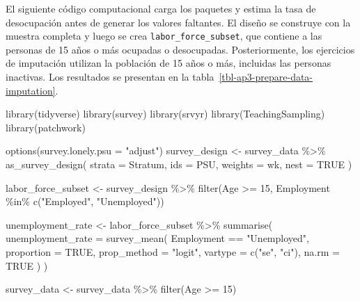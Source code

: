 \documentclass[
  spanish,
  11pt,
  letterpaper,
  oneside,
  open=any]{scrbook}
\newenvironment{Shaded}{\begin{snugshade}}{\end{snugshade}}
\newcommand{\AttributeTok}[1]{\textcolor[rgb]{0.40,0.45,0.13}{#1}}
\newcommand{\ConstantTok}[1]{\textcolor[rgb]{0.56,0.35,0.01}{#1}}
\newcommand{\DecValTok}[1]{\textcolor[rgb]{0.68,0.00,0.00}{#1}}
\newcommand{\FunctionTok}[1]{\textcolor[rgb]{0.28,0.35,0.67}{#1}}
\newcommand{\NormalTok}[1]{\textcolor[rgb]{0.00,0.23,0.31}{#1}}
\newcommand{\OtherTok}[1]{\textcolor[rgb]{0.00,0.23,0.31}{#1}}
\newcommand{\SpecialCharTok}[1]{\textcolor[rgb]{0.37,0.37,0.37}{#1}}
\newcommand{\StringTok}[1]{\textcolor[rgb]{0.13,0.47,0.30}{#1}}
\begin{document}
El siguiente código computacional carga los paquetes y estima la tasa de
desocupación antes de generar los valores faltantes. El diseño se
construye con la muestra completa y luego se crea
\texttt{labor\_force\_subset}, que contiene a las personas de 15 años o
más ocupadas o desocupadas. Posteriormente, los ejercicios de imputación
utilizan la población de 15 años o más, incluidas las personas
inactivas. Los resultados se presentan en la
tabla~\ref{tbl-ap3-prepare-data-imputation}.

\begin{Shaded}
\begin{Highlighting}[]
\FunctionTok{library}\NormalTok{(tidyverse)}
\FunctionTok{library}\NormalTok{(survey)}
\FunctionTok{library}\NormalTok{(srvyr)}
\FunctionTok{library}\NormalTok{(TeachingSampling)}
\FunctionTok{library}\NormalTok{(patchwork)}

\FunctionTok{options}\NormalTok{(}\AttributeTok{survey.lonely.psu =} \StringTok{"adjust"}\NormalTok{)}
\NormalTok{survey\_design }\OtherTok{\textless{}{-}}\NormalTok{ survey\_data }\SpecialCharTok{\%\textgreater{}\%}
  \FunctionTok{as\_survey\_design}\NormalTok{(}
    \AttributeTok{strata =}\NormalTok{ Stratum,}
    \AttributeTok{ids =}\NormalTok{ PSU,}
    \AttributeTok{weights =}\NormalTok{ wk,}
    \AttributeTok{nest =} \ConstantTok{TRUE}
\NormalTok{  )}

\NormalTok{labor\_force\_subset }\OtherTok{\textless{}{-}}\NormalTok{ survey\_design }\SpecialCharTok{\%\textgreater{}\%}
  \FunctionTok{filter}\NormalTok{(Age }\SpecialCharTok{\textgreater{}=} \DecValTok{15}\NormalTok{, Employment }\SpecialCharTok{\%in\%} \FunctionTok{c}\NormalTok{(}\StringTok{"Employed"}\NormalTok{, }\StringTok{"Unemployed"}\NormalTok{))}

\NormalTok{unemployment\_rate }\OtherTok{\textless{}{-}}\NormalTok{ labor\_force\_subset }\SpecialCharTok{\%\textgreater{}\%}
  \FunctionTok{summarise}\NormalTok{(}
    \AttributeTok{unemployment\_rate =} \FunctionTok{survey\_mean}\NormalTok{(}
\NormalTok{      Employment }\SpecialCharTok{==} \StringTok{"Unemployed"}\NormalTok{,}
      \AttributeTok{proportion =} \ConstantTok{TRUE}\NormalTok{,}
      \AttributeTok{prop\_method =} \StringTok{"logit"}\NormalTok{,}
      \AttributeTok{vartype =} \FunctionTok{c}\NormalTok{(}\StringTok{"se"}\NormalTok{, }\StringTok{"ci"}\NormalTok{),}
      \AttributeTok{na.rm =} \ConstantTok{TRUE}
\NormalTok{    )}
\NormalTok{  )}

\NormalTok{survey\_data }\OtherTok{\textless{}{-}}\NormalTok{ survey\_data }\SpecialCharTok{\%\textgreater{}\%}
  \FunctionTok{filter}\NormalTok{(Age }\SpecialCharTok{\textgreater{}=} \DecValTok{15}\NormalTok{)}
\end{Highlighting}
\end{Shaded}
\end{document}
